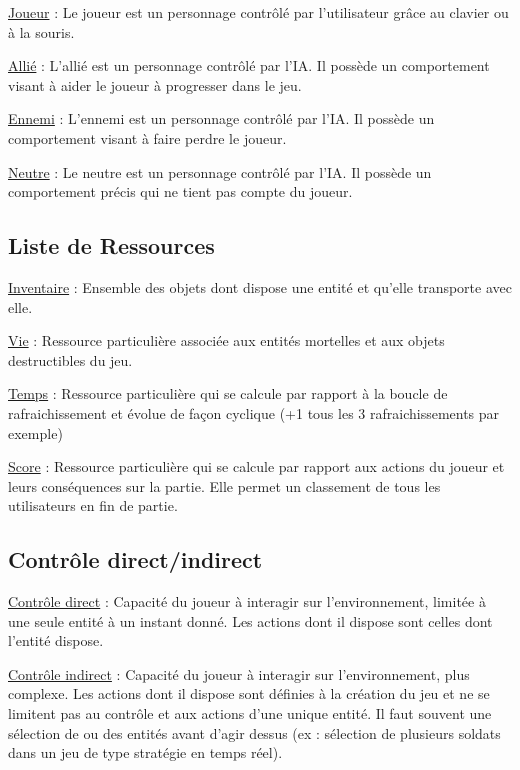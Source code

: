\underline{Joueur} :
Le joueur est un personnage contrôlé par l'utilisateur grâce au clavier ou à la souris.

\underline{Allié} :
L'allié est un personnage contrôlé par l'IA. Il possède un comportement visant à aider le joueur à progresser dans le jeu.

\underline{Ennemi} :
L'ennemi est un personnage contrôlé par l'IA. Il possède un comportement visant à faire perdre le joueur.

\underline{Neutre} :
Le neutre est un personnage contrôlé par l'IA. Il possède un comportement précis qui ne tient pas compte du joueur.


\subsection*{Liste de Ressources}


\underline{Inventaire} : 
Ensemble des objets dont dispose une entité et qu'elle transporte avec elle.

\underline{Vie} : 
Ressource particulière associée aux entités mortelles et aux objets destructibles du jeu.

\underline{Temps} :
Ressource particulière qui se calcule par rapport à la boucle de rafraichissement et évolue de façon cyclique (+1 tous les 3 rafraichissements par exemple)

\underline{Score} :
Ressource particulière qui se calcule par rapport aux actions du joueur et leurs conséquences sur la partie.
Elle permet un classement de tous les utilisateurs en fin de partie.

\subsection*{Contrôle direct/indirect}

\underline{Contrôle direct} :
Capacité du joueur à interagir sur l’environnement, limitée à une seule entité à un instant donné. 
Les actions dont il dispose sont celles dont l'entité dispose.

\underline{Contrôle indirect} :
Capacité du joueur à interagir sur l’environnement, plus complexe. 
Les actions dont il dispose sont définies à la création du jeu et ne se limitent pas au contrôle et aux actions d'une unique entité.
Il faut souvent une sélection de ou des entités avant d'agir dessus (ex : sélection de plusieurs soldats dans un jeu de type stratégie en temps réel).

